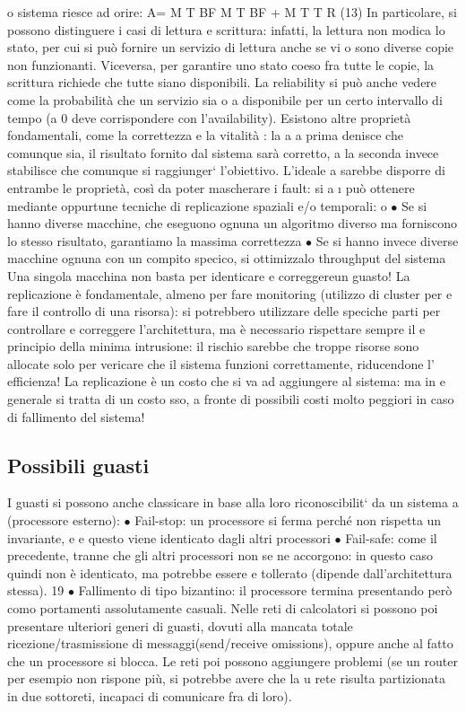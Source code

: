 o
sistema riesce ad orire:
A=
M T BF
M T BF + M T T R
(13)
In particolare, si possono distinguere i casi di lettura e scrittura: infatti, la lettura
non modica lo stato, per cui si può fornire un servizio di lettura anche se vi
o
sono diverse copie non funzionanti. Viceversa, per garantire uno stato coeso fra
tutte le copie, la scrittura richiede che tutte siano disponibili.
La reliability si può anche vedere come la probabilità che un servizio sia
o
a
disponibile per un certo intervallo di tempo (a 0 deve corrispondere con l'availability).
Esistono altre proprietà fondamentali, come la correttezza e la vitalità : la
a
a
prima denisce che comunque sia, il risultato fornito dal sistema sarà corretto,
a
la seconda invece stabilisce che comunque si raggiunger` l'obiettivo. L'ideale
a
sarebbe disporre di entrambe le proprietà, così da poter mascherare i fault: si
a
\i{}
può ottenere mediante oppurtune tecniche di replicazione spaziali e/o temporali:
o
$\bullet$ Se si hanno diverse macchine, che eseguono ognuna un algoritmo diverso
ma forniscono lo stesso risultato, garantiamo la massima correttezza
$\bullet$ Se si hanno invece diverse macchine ognuna con un compito specico, si
ottimizzalo throughput del sistema
Una singola macchina non basta per identicare e correggereun guasto! La
replicazione è fondamentale, almeno per fare monitoring (utilizzo di cluster per
e
fare il controllo di una risorsa): si potrebbero utilizzare delle speciche parti
per controllare e correggere l'architettura, ma è necessario rispettare sempre il
e
principio della minima intrusione: il rischio sarebbe che troppe risorse sono
allocate solo per vericare che il sistema funzioni correttamente, riducendone l'
efficienza! La replicazione è un costo che si va ad aggiungere al sistema: ma in
e
generale si tratta di un costo sso, a fronte di possibili costi molto peggiori in
caso di fallimento del sistema!
\subsection{Possibili guasti}
I guasti si possono anche classicare in base alla loro riconoscibilit` da un sistema
a
(processore esterno):
$\bullet$ Fail-stop: un processore si ferma perché non rispetta un invariante, e
e
questo viene identicato dagli altri processori
$\bullet$ Fail-safe: come il precedente, tranne che gli altri processori non se ne
accorgono: in questo caso quindi non è identicato, ma potrebbe essere
e
tollerato (dipende dall'architettura stessa).
19
$\bullet$ Fallimento di tipo bizantino: il processore termina presentando però como
portamenti assolutamente casuali.
Nelle reti di calcolatori si possono poi presentare ulteriori generi di guasti, dovuti
alla mancata totale ricezione/trasmissione di messaggi(send/receive omissions),
oppure anche al fatto che un processore si blocca. Le reti poi possono aggiungere
problemi (se un router per esempio non rispone più, si potrebbe avere che la
u
rete risulta partizionata in due sottoreti, incapaci di comunicare fra di loro).

